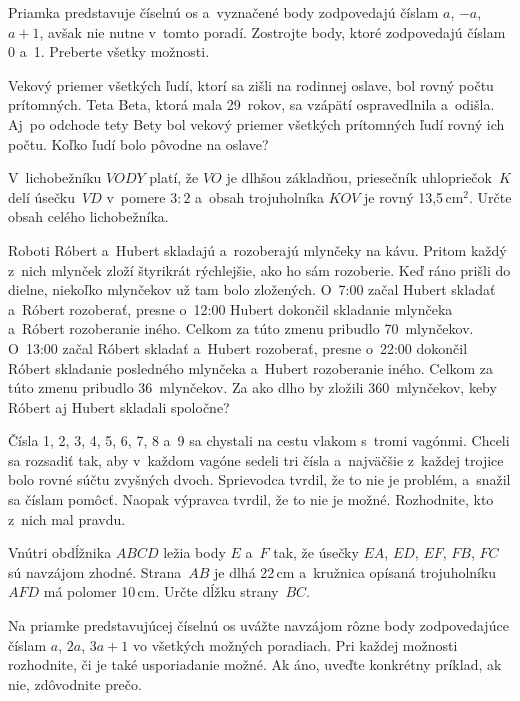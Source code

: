 {%
Priamka predstavuje číselnú os a~vyznačené body zodpovedajú číslam $a$, ${-a}$, $a+1$, avšak nie nutne v~tomto poradí.
Zostrojte body, ktoré zodpovedajú číslam 0 a~1.
Preberte všetky možnosti.
%
}

{%
Vekový priemer všetkých ľudí, ktorí sa zišli na rodinnej oslave, bol rovný počtu prítomných.
Teta Beta, ktorá mala 29~rokov, sa vzápätí ospravedlnila a~odišla.
Aj~po odchode tety Bety bol vekový priemer všetkých prítomných ľudí rovný ich počtu.
Koľko ľudí bolo pôvodne na oslave?
}

{%
V~lichobežníku $VODY$ platí, že $VO$ je dlhšou základňou, priesečník uhlopriečok~$K$ delí úsečku~$VD$ v~pomere $3:2$ a~obsah trojuholníka $KOV$ je rovný 13{,}5\,cm$^2$.
Určte obsah celého lichobežníka.
}

{%
Roboti Róbert a~Hubert skladajú a~rozoberajú mlynčeky na kávu.
Pritom každý z~nich mlynček zloží štyrikrát rýchlejšie, ako ho sám rozoberie.
Keď ráno prišli do dielne, niekoľko mlynčekov už tam bolo zložených.
O~7:00 začal Hubert skladať a~Róbert rozoberať, presne o~12:00 Hubert dokončil skladanie mlynčeka a~Róbert rozoberanie iného.
Celkom za túto zmenu pribudlo 70~mlynčekov.
O~13:00 začal Róbert skladať a~Hubert rozoberať, presne o~22:00 dokončil Róbert skladanie posledného mlynčeka a~Hubert rozoberanie iného.
Celkom za túto zmenu pribudlo 36~mlynčekov.
Za ako dlho by zložili 360~mlynčekov, keby Róbert aj Hubert skladali spoločne?
}

{%
Čísla 1, 2, 3, 4, 5, 6, 7, 8 a~9 sa chystali na cestu vlakom s~tromi vagónmi.
Chceli sa rozsadiť tak, aby v~každom vagóne sedeli tri čísla a~najväčšie z~každej trojice bolo rovné súčtu zvyšných dvoch.
Sprievodca tvrdil, že to nie je problém, a~snažil sa číslam pomôcť.
Naopak výpravca tvrdil, že to nie je možné.
Rozhodnite, kto z~nich mal pravdu.
}

{%
Vnútri obdĺžnika $ABCD$ ležia body $E$ a~$F$ tak, že úsečky $EA$, $ED$, $EF$, $FB$, $FC$ sú navzájom zhodné.
Strana~$AB$ je dlhá 22\,cm a~kružnica opísaná trojuholníku $AFD$ má polomer 10\,cm.
Určte dĺžku strany~$BC$.
}

{%
Na priamke predstavujúcej číselnú os uvážte navzájom rôzne body zodpovedajúce číslam $a$, $2a$, $3a+1$ vo všetkých možných poradiach.
Pri každej možnosti rozhodnite, či je také usporiadanie možné.
Ak áno, uveďte konkrétny príklad, ak nie, zdôvodnite prečo.
%
}

